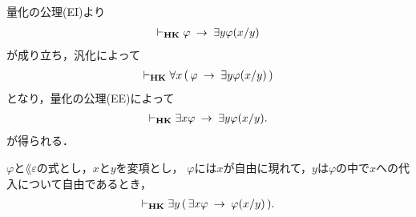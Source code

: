 	\begin{sketch}
		量化の公理(EI)より
		\begin{align}
			\vdash_{{\scriptsize \mbox{{\bf HK}}}} \varphi \hspace{0.25em}\rightarrow\hspace{0.25em} \exists y \varphi(x/y)
		\end{align}
		が成り立ち，汎化によって
		\begin{align}
			\vdash_{{\scriptsize \mbox{{\bf HK}}}} \forall x\, (\, \varphi \hspace{0.25em}\rightarrow\hspace{0.25em} \exists y \varphi(x/y)\, )
		\end{align}
		となり，量化の公理(EE)によって
		\begin{align}
			\vdash_{{\scriptsize \mbox{{\bf HK}}}} \exists x \varphi \hspace{0.25em}\rightarrow\hspace{0.25em} \exists y \varphi(x/y).
		\end{align}
		が得られる．
		\QED
	\end{sketch}
	
	\begin{screen}
		\begin{thm}\label{classic:lemma_for_Henkin_expansion}
			$\varphi$と$\lang{\varepsilon}$の式とし，$x$と$y$を変項とし，
			$\varphi$には$x$が自由に現れて，$y$は$\varphi$の中で$x$への代入について自由であるとき，
			\begin{align}
				\vdash_{{\scriptsize \mbox{{\bf HK}}}} \exists y\, (\, \exists x \varphi \hspace{0.25em}\rightarrow\hspace{0.25em} \varphi(x/y)\, ).
			\end{align}
		\end{thm}
	\end{screen}